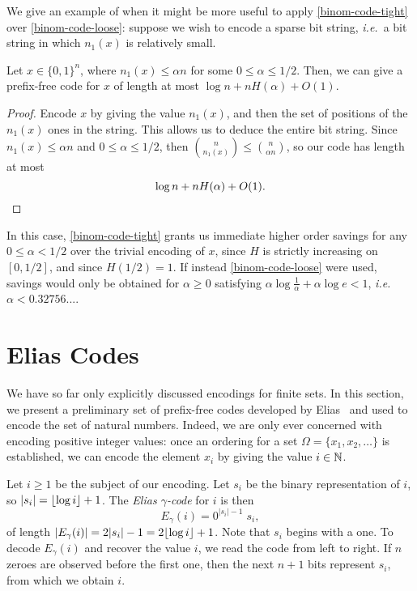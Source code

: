 We give an example of when it might be more useful to apply
\eqref{binom-code-tight} over \eqref{binom-code-loose}: suppose we
wish to encode a sparse bit string, \emph{i.e.}~a bit string in which
$n_1(x)$ is relatively small.
\begin{lem}
  Let $x \in \{0, 1\}^n$, where $n_1(x) \leq \alpha n$ for some
  $0 \leq \alpha \leq 1/2$. Then, we can give a prefix-free code for
  $x$ of length at most $\log n + n H(\alpha) + O(1)$.
\end{lem}
\begin{proof}
  Encode $x$ by giving the value $n_1(x)$, and then the set of
  positions of the $n_1(x)$ ones in the string. This allows us to
  deduce the entire bit string. Since $n_1(x) \leq \alpha n$ and
  $0 \leq \alpha \leq 1/2$, then
  ${n \choose n_1(x)} \leq {n \choose \alpha n}$, so our code has
  length at most
  \[\log n + n H(\alpha) + O(1). \qedhere\]
\end{proof}

In this case, \eqref{binom-code-tight} grants us immediate higher
order savings for any $0 \leq \alpha < 1/2$ over the trivial encoding
of $x$, since $H$ is strictly increasing on $[0, 1/2]$, and since
$H(1/2) = 1$. If instead \eqref{binom-code-loose} were used, savings
would only be obtained for $\alpha \geq 0$ satisfying $\alpha \log
\frac{1}{\alpha} + \alpha \log e < 1$, \emph{i.e.}~$\alpha <
0.32756...$.

\section{Elias Codes}

We have so far only explicitly discussed encodings for finite sets. In
this section, we present a preliminary set of prefix-free codes
developed by Elias~\cite{elias:coding} and used to encode the set of
natural numbers. Indeed, we are only ever concerned with encoding
positive integer values: once an ordering for a set $\Omega = \{x_1,
x_2, \ldots \}$ is established, we can encode the element $x_i$ by
giving the value $i \in \mathbb{N}$.

Let $i \geq 1$ be the subject of our encoding. Let $s_i$ be the binary
representation of $i$, so $|s_i| = {\lfloor \log i \rfloor} + 1$. The
\emph{Elias $\gamma$-code} for $i$ is then
\[E_\gamma(i) = 0^{|s_i| - 1} \; s_i,\]
of length $|E_\gamma(i)| = 2|s_i| - 1 = 2 {\lfloor \log i \rfloor} + 1$. Note
that $s_i$ begins with a one. To decode $E_\gamma(i)$ and recover the
value $i$, we read the code from left to right. If $n$ zeroes are
observed before the first one, then the next $n + 1$ bits represent
$s_i$, from which we obtain $i$.

